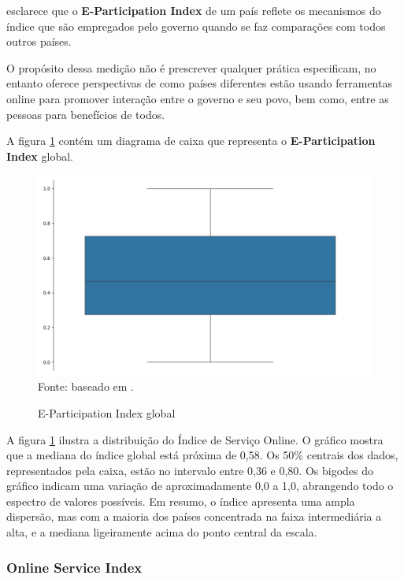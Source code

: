 \cite{ONU_egdi} esclarece que o \textbf{E-Participation Index} de um país reflete os mecanismos do índice que são empregados pelo governo quando se faz comparações com todos outros países. 

O propósito dessa medição não é prescrever qualquer prática especificam, no entanto oferece perspectivas de como países diferentes estão usando ferramentas online para promover interação entre o governo e seu povo, bem como, entre as pessoas para benefícios de todos.

A figura \ref{fig:boxplot_epart_global} contém um diagrama de caixa que representa o \textbf{E-Participation Index} global.

\begin{figure}[H]
	\centering
	\caption{E-Participation Index global}
	\includegraphics[width=1\linewidth]{figuras/egdi/boxplot_epart_global.png}
	\label{fig:boxplot_epart_global}
	\footnotesize{Fonte: baseado em \cite{ONU_edgi_mapa}.}
\end{figure}

A figura \ref{fig:boxplot_epart_global} ilustra a distribuição do Índice de Serviço Online. O gráfico mostra que a mediana do índice global está próxima de 0,58. Os 50\% centrais dos dados, representados pela caixa, estão no intervalo entre 0,36 e 0,80. Os bigodes do gráfico indicam uma variação de aproximadamente 0,0 a 1,0, abrangendo todo o espectro de valores possíveis. Em resumo, o índice apresenta uma ampla dispersão, mas com a maioria dos países concentrada na faixa intermediária a alta, e a mediana ligeiramente acima do ponto central da escala.

\subsubsection{Online Service Index}
\label{osi}

